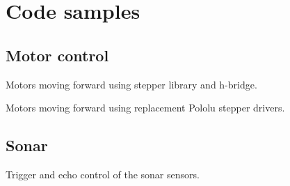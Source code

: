 \chapter{Code samples}


\section{Motor control}
Motors moving forward using stepper library and h-bridge.


Motors moving forward using replacement Pololu stepper drivers.


\section{Sonar}
Trigger and echo control of the sonar sensors.


